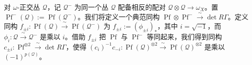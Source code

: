 对 $\omega$-正交丛 $\mathcal{Q}$，记 $\mathcal{Q}^{-}$ 为同一个丛 $\mathcal{Q}$ 配备相反的配对 $\mathcal{Q}\otimes\mathcal{Q}\to\omega_{X}$。置 $\operatorname{Pf}^{-}(\mathcal{Q}):=\operatorname{Pf}(\mathcal{Q}^{-})$。我们将定义一个典范同构 $\operatorname{Pf}\otimes\operatorname{Pf}^{-}\xrightarrow{\ \sim\ }\det R\Gamma$。定义同构 $f_{\pm i}:\operatorname{Pf}(\mathcal{Q})\xrightarrow{\ \sim\ }\operatorname{Pf}(\mathcal{Q}^{-})$ 为 $f_{\pm i}:=(\phi_{\pm i})_{*}$，其中 $i=\sqrt{-1}$，而 $\phi_{i}:\mathcal{Q}\xrightarrow{\ \sim\ }\mathcal{Q}^{-}$ 是乘以 $i$。借助 $f_{\pm i}$ 把 $\operatorname{Pf}$ 与 $\operatorname{Pf}^{-}$ 等同起来，我们得到同构 $c_{\pm i}:\operatorname{Pf}^{\otimes 2}\xrightarrow{\ \sim\ }\det R\Gamma$，使得 $(c_{i})^{-1}c_{-i}:\operatorname{Pf}(\mathcal{Q})^{\otimes 2}\xrightarrow{\ \sim\ }\operatorname{Pf}(\mathcal{Q})^{\otimes 2}$ 是乘以 $(-1)^{p(\mathcal{Q})}$。

